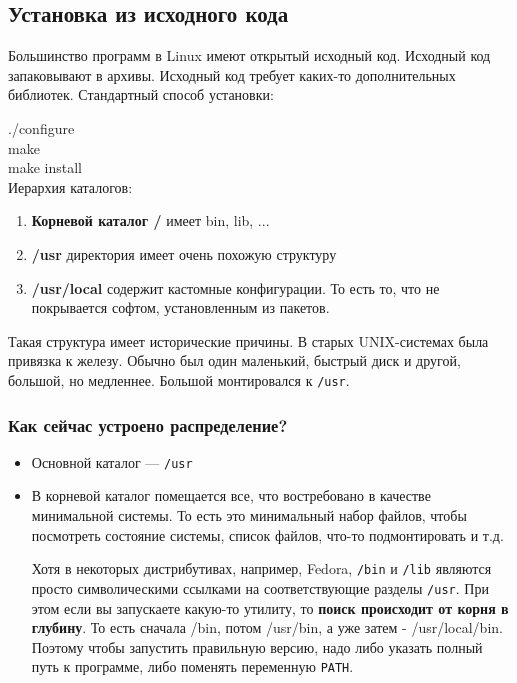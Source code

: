 \subsection{Установка из исходного кода}
Большинство программ в Linux имеют открытый исходный код. 
Исходный код запаковывают в архивы. 
Исходный код требует каких-то дополнительных библиотек.
Стандартный способ установки: 

	./configure \\
	make  \\
	make install \\

Иерархия каталогов:
\begin{enumerate}
	\item \textbf{Корневой каталог /} имеет bin, lib, ...
	\item \textbf{/usr} директория имеет очень похожую структуру
	\item \textbf{/usr/local} содержит кастомные конфигурации. То есть то, что не покрывается софтом, установленным из пакетов.
\end{enumerate}

Такая структура имеет исторические причины. В старых UNIX-системах была привязка к железу. Обычно был один маленький, быстрый диск и другой, большой, но медленнее. Большой монтировался к \texttt{/usr}.

\subsubsection{Как сейчас устроено распределение?} 

\begin{itemize}
  \item Основной каталог --- \texttt{/usr}

\item В корневой каталог помещается все, что востребовано в качестве минимальной системы. То есть это минимальный набор файлов, чтобы посмотреть состояние системы, список файлов, что-то подмонтировать и т.д.

Хотя в некоторых дистрибутивах, например, Fedora, \texttt{/bin} и \texttt{/lib} являются просто символическими ссылками на соответствующие разделы \texttt{/usr}. При этом если вы запускаете какую-то утилиту, то \textbf{поиск происходит от корня в глубину}. То есть сначала /bin, потом /usr/bin, а уже затем - /usr/local/bin. Поэтому чтобы запустить правильную версию, надо либо указать полный путь к программе, либо поменять переменную \texttt{PATH}.
\end{itemize}

